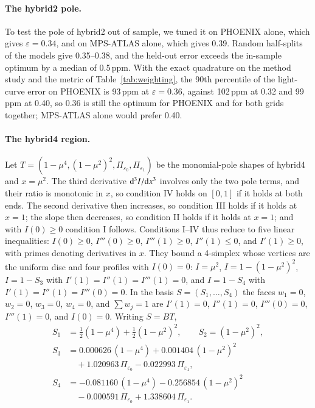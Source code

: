 \documentclass{aa}
\newcommand{\ppm}{\,\textrm{ppm}}
\begin{document}
\begin{appendix}
\paragraph{The hybrid2 pole.} To test the pole of hybrid2 out of sample, we
tuned it on PHOENIX alone, which gives $\varepsilon=0.34$, and on MPS-ATLAS
alone, which gives 0.39. Random half-splits of the models give 0.35--0.38, and
the held-out error exceeds the in-sample optimum by a median of 0.5\ppm. With
the exact quadrature on the method study and the metric of
Table~\ref{tab:weighting}, the 90th percentile of the light-curve error on
PHOENIX is 93\ppm{} at $\varepsilon=0.36$, against 102\ppm{} at 0.32 and
99\ppm{} at 0.40, so 0.36 is still the optimum for PHOENIX and for both grids
together; MPS-ATLAS alone would prefer 0.40.

\paragraph{The hybrid4 region.} Let $T=(1-\mu^4,(1-\mu^2)^2,\Pi_{\varepsilon_0},
\Pi_{\varepsilon_1})$ be the monomial-pole shapes of hybrid4 and $x=\mu^2$. The
third derivative ${\rm d}^3I/{\rm d}x^3$ involves only the two pole terms, and
their ratio is monotonic in $x$, so condition IV holds on $[0,1]$ if it holds
at both ends. The second derivative then increases, so condition III holds if
it holds at $x=1$; the slope then decreases, so condition II holds if it holds
at $x=1$; and with $I(0)\ge0$ condition I follows. Conditions I--IV thus reduce
to five linear inequalities: $I(0)\ge0$, $I'''(0)\ge0$, $I'''(1)\ge0$,
$I''(1)\le0$, and $I'(1)\ge0$, with primes denoting derivatives in $x$. They
bound a 4-simplex whose vertices are the uniform disc and four profiles with
$I(0)=0$: $I=\mu^2$, $I=1-(1-\mu^2)^2$, $I=1-S_3$ with
$I'(1)=I''(1)=I'''(1)=0$, and $I=1-S_4$ with $I'(1)=I''(1)=I'''(0)=0$. In
the basis $S=(S_1,\dots,S_4)$ the faces $w_1=0$, $w_2=0$, $w_3=0$, $w_4=0$,
and $\sum w_j=1$ are $I'(1)=0$, $I''(1)=0$, $I'''(0)=0$, $I'''(1)=0$, and
$I(0)=0$. Writing $S=BT$,
\begin{align}
S_1&=\tfrac12(1-\mu^4)+\tfrac12(1-\mu^2)^2,\qquad S_2=(1-\mu^2)^2,\nonumber\\
S_3&=0.000626\,(1-\mu^4)+0.001404\,(1-\mu^2)^2\nonumber\\
&\quad+1.020963\,\Pi_{\varepsilon_0}-0.022993\,\Pi_{\varepsilon_1},\nonumber\\
S_4&=-0.081160\,(1-\mu^4)-0.256854\,(1-\mu^2)^2\nonumber\\
&\quad-0.000591\,\Pi_{\varepsilon_0}+1.338604\,\Pi_{\varepsilon_1}.\nonumber

\end{align}
\end{appendix}
\end{document}

